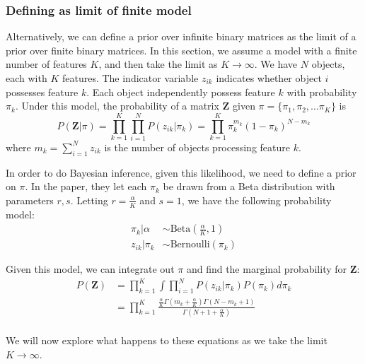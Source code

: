 \documentclass[twoside]{article}
\begin{document}
\subsubsection{Defining as limit of finite model}
Alternatively, we can define a prior over infinite binary matrices as the limit of a prior over finite binary matrices. In this section, we assume a model with a finite number of features $K$, and then take the limit as $K \to \infty$. We have $N$ objects, each with $K$ features. The indicator variable $z_{ik}$ indicates whether object $i$ possesses feature $k$. Each object independently possess feature $k$ with probability $\pi_k$. Under this model, the probability of a matrix $\mathbf{Z}$ given $\pi = \{\pi_1, \pi_2, \dots \pi_K\}$ is
\begin{equation}
    P(\mathbf{Z} | \pi) = \prod_{k = 1}^K \prod_{i = 1}^N P(z_{ik} | \pi_k) = \prod_{k = 1}^K \pi_k^{m_k} (1 - \pi_k)^{N-m_k}
\end{equation}
where $m_k = \sum_{i=1}^N z_{ik}$ is the number of objects processing feature $k$.

In order to do Bayesian inference, given this likelihood, we need to define a prior on $\pi$. In the paper, they let each $\pi_k$ be drawn from a Beta distribution with parameters $r, s$. Letting $r = \frac{\alpha}{K}$ and $s = 1$, we have the following probability model:
\begin{equation}
\begin{split}
    \pi_k | \alpha & \sim \text{Beta}(\frac{\alpha}{K}, 1) \\
    z_{ik} | \pi_k & \sim \text{Bernoulli}(\pi_k)
\end{split}
\end{equation}

Given this model, we can integrate out $\pi$ and find the marginal probability for $\mathbf{Z}$:
\begin{equation}
\begin{split}
    P(\mathbf{Z}) & = \prod_{k = 1}^K \int \prod_{i = 1}^N P(z_{ik} | \pi_k) P(\pi_k) d\pi_k \\
    &  = \prod_{k = 1}^K \frac{\frac{\alpha}{K} \Gamma(m_k + \frac{\alpha}{K}) \Gamma(N - m_k + 1)}{\Gamma(N + 1 + \frac{\alpha}{K})} \\
\end{split}
\label{eq:pz}
\end{equation}

We will now explore what happens to these equations as we take the limit $K \to \infty$.
\end{document}
